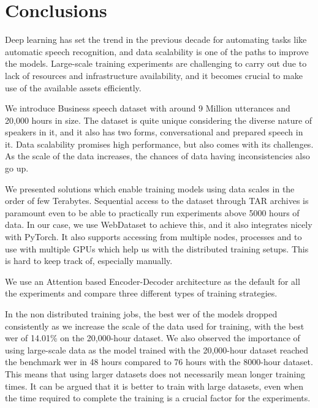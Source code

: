 \chapter{Conclusions}
\label{chapter:conclusions}

Deep learning has set the trend in the previous decade for automating tasks like automatic speech recognition, and data scalability is one of the paths to improve the models. Large-scale training experiments are challenging to carry out due to lack of resources and infrastructure availability, and it becomes crucial to make use of the available assets efficiently.

We introduce Business speech dataset with around 9 Million utterances and 20,000 hours in size. The dataset is quite unique considering the diverse nature of speakers in it, and it also has two forms, conversational and prepared speech in it. Data scalability promises high performance, but also comes with its challenges. As the scale of the data increases, the chances of data having inconsistencies also go up.  

We presented solutions which enable training models using data scales in the order of few Terabytes. Sequential access to the dataset through TAR archives is paramount even to be able to practically run experiments above 5000 hours of data. In our case, we use WebDataset to achieve this, and it also integrates nicely with PyTorch. It also supports accessing from multiple nodes, processes and to use with multiple GPUs which help us with the distributed training setups. This is hard to keep track of, especially manually. 

We use an Attention based Encoder-Decoder architecture as the default for all the experiments and compare three different types of training strategies. 

In the non distributed training jobs, the best \acrshort{wer} of the models dropped consistently as we increase the scale of the data used for training, with the best \acrshort{wer} of 14.01\% on the 20,000-hour dataset. We also observed the importance of using large-scale data as the model trained with the 20,000-hour dataset reached the benchmark \acrshort{wer} in 48 hours compared to 76 hours with the 8000-hour dataset. This means that using larger datasets does not necessarily mean longer training times. It can be argued that it is better to train with large datasets, even when the time required to complete the training is a crucial factor for the experiments.

